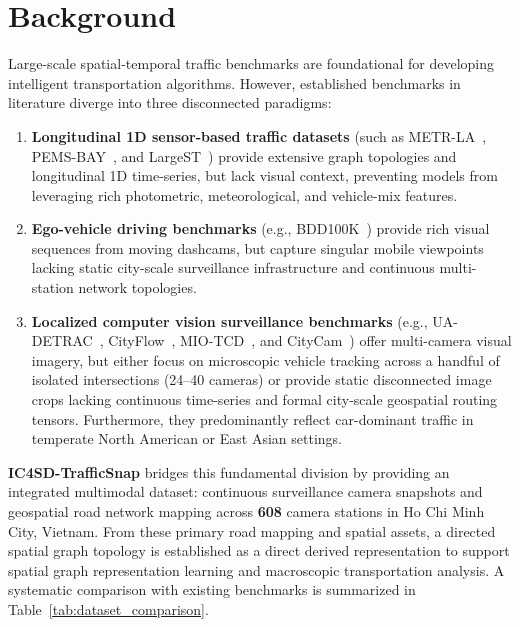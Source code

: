 \documentclass[preprint,12pt]{elsarticle}
\begin{document}
\section{Background}
Large-scale spatial-temporal traffic benchmarks are foundational for developing intelligent transportation algorithms. However, established benchmarks in literature diverge into three disconnected paradigms:
\begin{enumerate}
    \item \textbf{Longitudinal 1D sensor-based traffic datasets} (such as METR-LA~\cite{li2018diffusion}, PEMS-BAY~\cite{li2018diffusion}, and LargeST~\cite{liu2023largest}) provide extensive graph topologies and longitudinal 1D time-series, but lack visual context, preventing models from leveraging rich photometric, meteorological, and vehicle-mix features.
    \item \textbf{Ego-vehicle driving benchmarks} (e.g., BDD100K~\cite{yu2020bdd100k}) provide rich visual sequences from moving dashcams, but capture singular mobile viewpoints lacking static city-scale surveillance infrastructure and continuous multi-station network topologies.
    \item \textbf{Localized computer vision surveillance benchmarks} (e.g., UA-DETRAC~\cite{wen2020ua}, CityFlow~\cite{tang2019cityflow}, MIO-TCD~\cite{luo2018miotcd}, and CityCam~\cite{zhang2017understanding}) offer multi-camera visual imagery, but either focus on microscopic vehicle tracking across a handful of isolated intersections (24–40 cameras) or provide static disconnected image crops lacking continuous time-series and formal city-scale geospatial routing tensors. Furthermore, they predominantly reflect car-dominant traffic in temperate North American or East Asian settings.
\end{enumerate}
\textbf{IC4SD-TrafficSnap} bridges this fundamental division by providing an integrated multimodal dataset: continuous surveillance camera snapshots and geospatial road network mapping across \textbf{608} camera stations in Ho Chi Minh City, Vietnam. From these primary road mapping and spatial assets, a directed spatial graph topology is established as a direct derived representation to support spatial graph representation learning and macroscopic transportation analysis. A systematic comparison with existing benchmarks is summarized in Table~\ref{tab:dataset_comparison}.


\FloatBarrier
\end{document}
